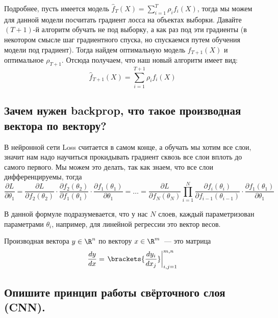 Подробнее, пусть имеется модель $\hat{f}_T(X) = \sum\limits_{i = 1}^T \rho_i f_i(X)$, тогда мы можем для данной модели посчитать градиент лосса на объектах выборки. Давайте $(T + 1)$-й алгоритм обучать не под выборку, а как раз под эти градиенты (в некотором смысле шаг градиентного спуска, но спускаемся путем обучения модели под градиент). Тогда найдем оптимальную модель $f_{T + 1}(X)$ и оптимальное $\rho_{T + 1}$. Отсюда получаем, что наш новый алгоритм имеет вид:
$$
\hat{f}_{T + 1}(X) = \sum\limits_{i = 1}^{T + 1} \rho_i f_i(X)
$$






\subsection{Зачем нужен backprop, что такое производная вектора по вектору?}

В нейронной сети Loss считается в самом конце, а обучать мы хотим все слои, значит нам надо научиться прокидывать градиент сквозь все слои вплоть до самого первого. Мы можем это делать, так как знаем, что все слои дифференцируемы, тогда
\begin{equation*}
    \frac{\partial L}{\partial \theta_1} = \frac{\partial L}{\partial f_2(\theta_2)} \cdot \frac{\partial f_2(\theta_2)}{\partial f_1(\theta_1)} \cdot \frac{\partial f_1(\theta_1)}{\partial \theta_1} = \ldots = \frac{\partial L}{\partial f_N(\theta_N)} \prod\limits_{i = 1}^N \frac{\partial f_i(\theta_i)}{\partial f_{i - 1}(\theta_{i - 1})} \cdot \frac{\partial f_1(\theta_1)}{\partial \theta_1}
\end{equation*}

В данной формуле подразумевается, что у нас $N$ слоев, каждый параметризован параметрами $\theta_i$, например, для линейной регрессии это вектор весов.

Производная вектора $y \in \R^n$ по вектору $x \in \R^m$~--- это матрица
$$
\frac{dy}{dx} = \left.\brackets{\frac{dy_i}{dx_j}}\right|_{i, j = 1}^{m, n}
$$









\subsection{Опишите принцип работы свёрточного слоя (CNN).}

